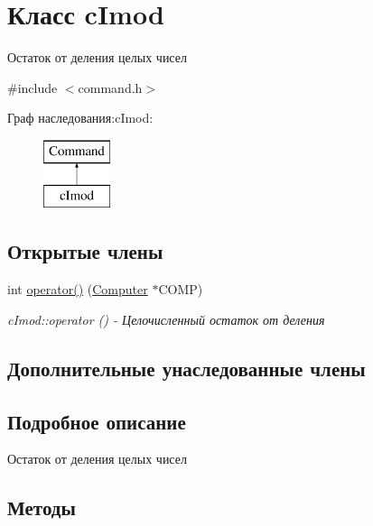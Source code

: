 \hypertarget{classc_imod}{}\section{Класс c\+Imod}
\label{classc_imod}


Остаток от деления целых чисел  




{\ttfamily \#include $<$command.\+h$>$}

Граф наследования\+:c\+Imod\+:\begin{figure}[H]
\begin{center}
\leavevmode
\includegraphics[height=2.000000cm]{classc_imod}
\end{center}
\end{figure}
\subsection*{Открытые члены}
\begin{DoxyCompactItemize}
\item 
int \hyperlink{classc_imod_a2a46c860bd31b90c26081e8e450532e5}{operator()} (\hyperlink{class_computer}{Computer} $\ast$C\+O\+MP)
\begin{DoxyCompactList}\small\item\em c\+Imod\+::operator () -\/ Целочисленный остаток от деления \end{DoxyCompactList}\end{DoxyCompactItemize}
\subsection*{Дополнительные унаследованные члены}


\subsection{Подробное описание}
Остаток от деления целых чисел 

\subsection{Методы}
\hypertarget{classc_imod_a2a46c860bd31b90c26081e8e450532e5}{}\label{classc_imod_a2a46c860bd31b90c26081e8e450532e5} 
